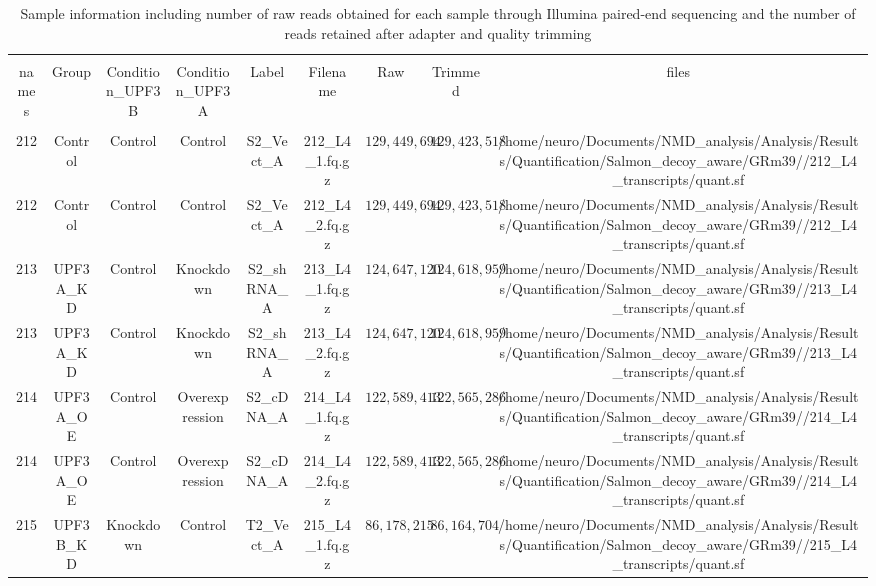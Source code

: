 
\begin{table}[!htbp] \centering 
  \caption{Sample information including number of raw reads obtained for each sample through Illumina paired-end sequencing and the number of reads retained after adapter and quality trimming} 
  \label{} 
\begin{tabular}{@{\extracolsep{5pt}} ccccccccc} 
\\[-1.8ex]\hline 
\hline \\[-1.8ex] 
names & Group & Condition\_UPF3B & Condition\_UPF3A & Label & Filename & Raw & Trimmed & files \\ 
\hline \\[-1.8ex] 
212 & Control & Control & Control & S2\_Vect\_A & 212\_L4\_1.fq.gz & $129,449,694$ & $129,423,518$ & /home/neuro/Documents/NMD\_analysis/Analysis/Results/Quantification/Salmon\_decoy\_aware/GRm39//212\_L4\_transcripts/quant.sf \\ 
212 & Control & Control & Control & S2\_Vect\_A & 212\_L4\_2.fq.gz & $129,449,694$ & $129,423,518$ & /home/neuro/Documents/NMD\_analysis/Analysis/Results/Quantification/Salmon\_decoy\_aware/GRm39//212\_L4\_transcripts/quant.sf \\ 
213 & UPF3A\_KD & Control & Knockdown & S2\_shRNA\_A & 213\_L4\_1.fq.gz & $124,647,120$ & $124,618,959$ & /home/neuro/Documents/NMD\_analysis/Analysis/Results/Quantification/Salmon\_decoy\_aware/GRm39//213\_L4\_transcripts/quant.sf \\ 
213 & UPF3A\_KD & Control & Knockdown & S2\_shRNA\_A & 213\_L4\_2.fq.gz & $124,647,120$ & $124,618,959$ & /home/neuro/Documents/NMD\_analysis/Analysis/Results/Quantification/Salmon\_decoy\_aware/GRm39//213\_L4\_transcripts/quant.sf \\ 
214 & UPF3A\_OE & Control & Overexpression & S2\_cDNA\_A & 214\_L4\_1.fq.gz & $122,589,413$ & $122,565,286$ & /home/neuro/Documents/NMD\_analysis/Analysis/Results/Quantification/Salmon\_decoy\_aware/GRm39//214\_L4\_transcripts/quant.sf \\ 
214 & UPF3A\_OE & Control & Overexpression & S2\_cDNA\_A & 214\_L4\_2.fq.gz & $122,589,413$ & $122,565,286$ & /home/neuro/Documents/NMD\_analysis/Analysis/Results/Quantification/Salmon\_decoy\_aware/GRm39//214\_L4\_transcripts/quant.sf \\ 
215 & UPF3B\_KD & Knockdown & Control & T2\_Vect\_A & 215\_L4\_1.fq.gz & $86,178,215$ & $86,164,704$ & /home/neuro/Documents/NMD\_analysis/Analysis/Results/Quantification/Salmon\_decoy\_aware/GRm39//215\_L4\_transcripts/quant.sf \\ 

\end{tabular}
\end{table}
